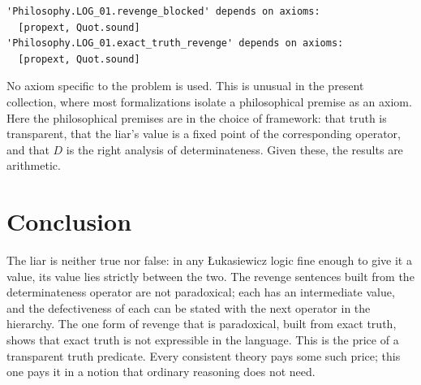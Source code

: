 \documentclass{situationist-preprint}
\begin{document}
\begin{lstlisting}
'Philosophy.LOG_01.revenge_blocked' depends on axioms:
  [propext, Quot.sound]
'Philosophy.LOG_01.exact_truth_revenge' depends on axioms:
  [propext, Quot.sound]
\end{lstlisting}

No axiom specific to the problem is used. This is unusual in the present collection, where most formalizations isolate a philosophical premise as an axiom. Here the philosophical premises are in the choice of framework: that truth is transparent, that the liar's value is a fixed point of the corresponding operator, and that $D$ is the right analysis of determinateness. Given these, the results are arithmetic.

\section{Conclusion}

The liar is neither true nor false: in any Łukasiewicz logic fine enough to give it a value, its value lies strictly between the two. The revenge sentences built from the determinateness operator are not paradoxical; each has an intermediate value, and the defectiveness of each can be stated with the next operator in the hierarchy. The one form of revenge that is paradoxical, built from exact truth, shows that exact truth is not expressible in the language. This is the price of a transparent truth predicate. Every consistent theory pays some such price; this one pays it in a notion that ordinary reasoning does not need.
\end{document}
